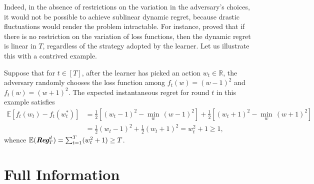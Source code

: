 Indeed, in the absence of restrictions on the variation in the adversary's choices, it would not be possible to achieve sublinear dynamic regret, because drastic fluctuations would render the problem intractable. For instance, \citet{besbes15} proved that if there is no restriction on the variation of loss functions, then the dynamic regret is linear in $T$, regardless of the strategy adopted by the learner. Let us illustrate this with a contrived example.
\begin{example}
Suppose that for $t \in [T]$, after the learner has picked an action $w_t \in \mathbb{R}$, the adversary randomly chooses the loss function among $f_t(w) = (w - 1)^2$ and $f_t(w) = (w + 1)^2$. The expected instantaneous regret for round $t$ in this example satisfies
\begin{equation}
\begin{split}
	\mathbb{E}[f_t(w_t) - f_t(w_t^*)]
	&= \frac{1}{2}\left[(w_t - 1)^2 - \min_{w}\, (w - 1)^2\right] + \frac{1}{2}\left[(w _t + 1)^2 - \min_{w}\, (w + 1)^2\right]
	\\	
	&= \frac{1}{2}(w_t - 1)^2 + \frac{1}{2}(w_t + 1)^2	
	= w_t^2 + 1
	\geq 1,
\end{split}
\end{equation}
whence $\mathbb{E}(\emph{\textbf{Reg}}_T^d) = \sum_{t=1}^T (w_t^2 + 1) \geq T$.
\end{example}


\section{Full Information}

